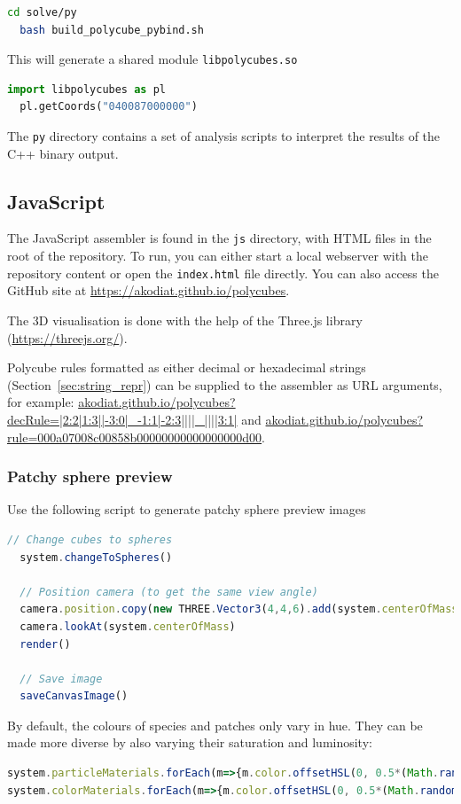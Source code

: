 \begin{lstlisting}[language=bash]
  cd solve/py
  bash build_polycube_pybind.sh
\end{lstlisting}

This will generate a shared module \texttt{libpolycubes.so}

\begin{lstlisting}[language=python]
  import libpolycubes as pl
  pl.getCoords("040087000000")
\end{lstlisting}

The \texttt{py} directory contains a set of analysis scripts to interpret the results of the C++ binary output.

\subsection{JavaScript}
The JavaScript assembler is found in the \texttt{js} directory, with HTML files in the root of the repository. To run, you can either start a local webserver with the repository content or open the \texttt{index.html} file directly. You can also access the GitHub site at \url{https://akodiat.github.io/polycubes}.

The 3D visualisation is done with the help of the Three.js library (\url{https://threejs.org/}).

Polycube rules formatted as either decimal or hexadecimal strings (Section~\ref{sec:string_repr}) can be supplied to the assembler as URL arguments, for example: \url{akodiat.github.io/polycubes?decRule=|2:2|1:3||-3:0|_-1:1|-2:3||||_||||3:1|} and \url{akodiat.github.io/polycubes?rule=000a07008c00858b00000000000000000d00}.

\subsubsection{Patchy sphere preview}

Use the following script to generate patchy sphere preview images
\begin{lstlisting}[language=JavaScript]
  // Change cubes to spheres
  system.changeToSpheres()

  // Position camera (to get the same view angle)
  camera.position.copy(new THREE.Vector3(4,4,6).add(system.centerOfMass))
  camera.lookAt(system.centerOfMass)
  render()

  // Save image
  saveCanvasImage()
\end{lstlisting}

By default, the colours of species and patches only vary in hue. They can be made more diverse by also varying their saturation and luminosity:
\begin{lstlisting}[language=JavaScript]
system.particleMaterials.forEach(m=>{m.color.offsetHSL(0, 0.5*(Math.random()-0.5), 0.5*(Math.random()-0.5))})
system.colorMaterials.forEach(m=>{m.color.offsetHSL(0, 0.5*(Math.random()-0.5), 0.5*(Math.random()-0.5))})
\end{lstlisting}


